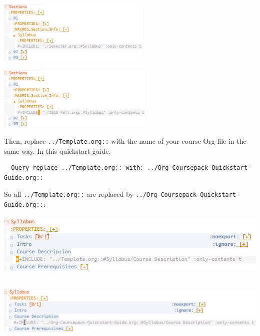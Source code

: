 \documentclass[10pt,article]{article}
\begin{document}
\begin{multicols}{2}
\begin{center}
\includegraphics[height=3cm]{../../../Assets/Images/Org-Teaching/Quickstart_Semester-Rename-Semester-Before.png}
\end{center}

\begin{center}
\includegraphics[height=3cm]{../../../Assets/Images/Org-Teaching/Quickstart_Semester-Rename-Semester-After.png}
\end{center}
\end{multicols}


Then, replace \texttt{../Template.org::} with the name of your course Org file in the
same way. In this quickstart guide,

\begin{verbatim}
  Query replace ../Template.org:: with: ../Org-Coursepack-Quickstart-Guide.org::
\end{verbatim}

So all \texttt{../Template.org::} are replaced by \texttt{../Org-Coursepack-Quickstart-Guide.org::}:

\begin{multicols}{2}
\begin{center}
\includegraphics[height=3cm]{../../../Assets/Images/Org-Teaching/Quickstart_Semester-Rename-Course-Before.png}
\end{center}

\begin{center}
\includegraphics[height=3cm]{../../../Assets/Images/Org-Teaching/Quickstart_Semester-Rename-Course-After.png}
\end{center}
\end{multicols}
\end{document}
